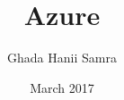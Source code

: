 \documentclass[a4paper,12pt]{book}
\begin{document}
\author{Ghada Hanii Samra}
\title{Azure}
\date{March 2017}

\frontmatter
\maketitle
\tableofcontents

\mainmatter



\backmatter
\end{document}
